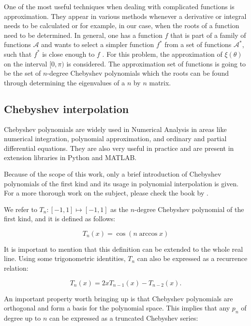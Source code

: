One of the most useful techniques when dealing with complicated functions is approximation. They appear in various methods whenever a derivative or integral needs to be calculated or for example, in our case, when the roots of a function need to be determined. In general, one has a function $f$ that is part of a family of functions $\mathcal{A}$ and wants to select a simpler function $f^*$ from a set of functions $\mathcal{A^*}$, such that $f^*$ is close enough to $f$ \cite[p.~3]{powell}. For this problem, the approximation of $\xi(\theta)$ on the interval $[0, \pi)$ is considered. The approximation set of functions is going to be the set of $n$-degree Chebyshev polynomials which the roots can be found through determining the eigenvalues of a $n$ by $n$ matrix.


\subsection{Chebyshev interpolation}

Chebyshev polynomials are widely used in Numerical Analysis in areas like numerical integration, polynomial approximation, and ordinary and partial differential equations.
They are also very useful in practice and are present in extension libraries in Python and MATLAB.

Because of the scope of this work, only a brief introduction of Chebyshev polynomials of the first kind and its usage in polynomial interpolation is given. For a more thorough work on the subject, please check the book by .

We refer to $T_n : [-1, 1] \mapsto [-1, 1]$ as the $n$-degree Chebyshev polynomial of the first kind, and it is defined as follows:

\begin{equation}
T_n(x) = \cos({n\arccos x})
\end{equation}

It is important to mention that this definition can be extended to the whole real line. Using some trigonometric identities, $T_n$ can also be expressed as a recurrence relation:

\begin{equation}
T_n(x) = 2xT_{n-1}(x) - T_{n-2}(x).
\end{equation}

An important property worth bringing up is that Chebyshev polynomials are orthogonal and form a basis for the polynomial space. This implies that any $p_n$ of degree up to $n$ can be expressed as a truncated Chebyshev series:

